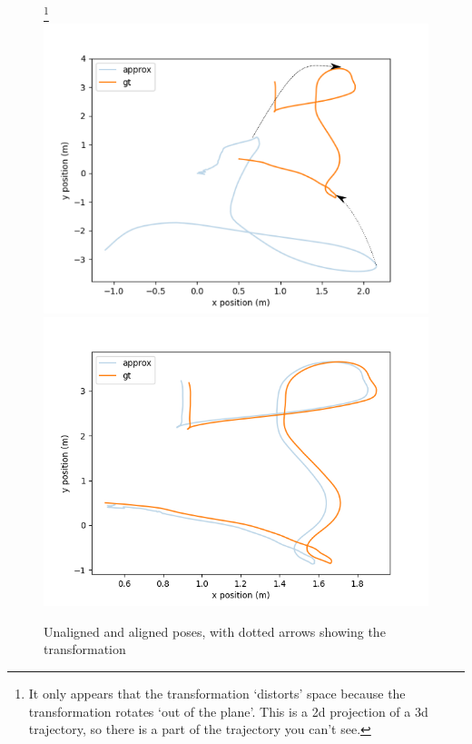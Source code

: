 \begin{figure}[H]
  \caption{Unaligned and aligned poses, with dotted arrows showing the transformation}
  \footnote{It only appears that the transformation `distorts' space because the transformation rotates `out of the plane'. This is a 2d projection of a 3d trajectory, so there is a part of the trajectory you can't see.}
  \includegraphics[width=\columnwidth]{unaligned.png}
  \includegraphics[width=\columnwidth]{aligned.png}
  \label{transformation}
\end{figure}
